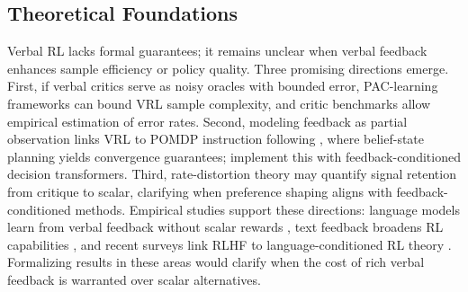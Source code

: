 

\subsection{Theoretical Foundations}
\label{sec:theoritical_foundation}
Verbal RL lacks formal guarantees; it remains unclear when verbal feedback enhances sample efficiency or policy quality. Three promising directions emerge. First, if verbal critics serve as noisy oracles with bounded error, PAC-learning frameworks \citep{strehl2009reinforcement} can bound VRL sample complexity, and critic benchmarks \citep{lin2024criticbench} allow empirical estimation of error rates. Second, modeling feedback as partial observation links VRL to POMDP instruction following \citep{luketina2019survey}, where belief-state planning yields convergence guarantees; \citet{mccallum2023feedback} implement this with feedback-conditioned decision transformers. Third, rate-distortion theory may quantify signal retention from critique to scalar, clarifying when preference shaping aligns with feedback-conditioned methods. Empirical studies support these directions: language models learn from verbal feedback without scalar rewards \citep{luo2025fcp}, text feedback broadens RL capabilities \citep{song2026expanding}, and recent surveys link RLHF to language-conditioned RL theory \citep{kaufmann2023survey}. Formalizing results in these areas would clarify when the cost of rich verbal feedback is warranted over scalar alternatives. 

